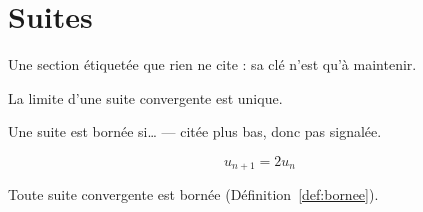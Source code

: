 \section{Suites}\label{sec:suites} %
Une section étiquetée que rien ne cite : sa clé n'est qu'à maintenir.

\begin{theorem}[title={Unicité}, label=thm:unicite] %
  La limite d'une suite convergente est unique.
\end{theorem}

\begin{definition}[label=def:bornee]
  Une suite est bornée si… — citée plus bas, donc pas signalée.
\end{definition}

\begin{equation}
  u_{n+1} = 2 u_n \label{eq:recurrence} %
\end{equation}

Toute suite convergente est bornée (Définition~\ref{def:bornee}).
